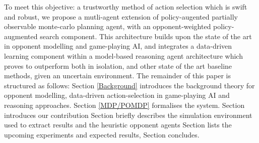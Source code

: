 To meet this objective: a trustworthy method of action selection which is swift and robust, we propose a mutli-agent extension of policy-augented partially observable monte-carlo planning agent, with an opponent-weighted policy-augmented search component. This architecture builds upon the state of the art in opponent modelling and game-playing AI, and integrates a data-driven learning component within a model-based reasoning agent architecture which proves to outperform both in isolation, and other state of the art baseline methods, given an uncertain environment.  
\newline \newline
The remainder of this paper is structured as follows: Section \ref{Background} introduces the background theory for opponent modelling, data-driven action-selection in game-playing AI and reasoning approaches. 
Section \ref{MDP/POMDP} formalises the system. 
Section introduces our contribution
Section briefly describes the simulation environment used to extract results and the heuristic opponent agents
Section lists the upcoming experiments and expected results, 
Section concludes. 